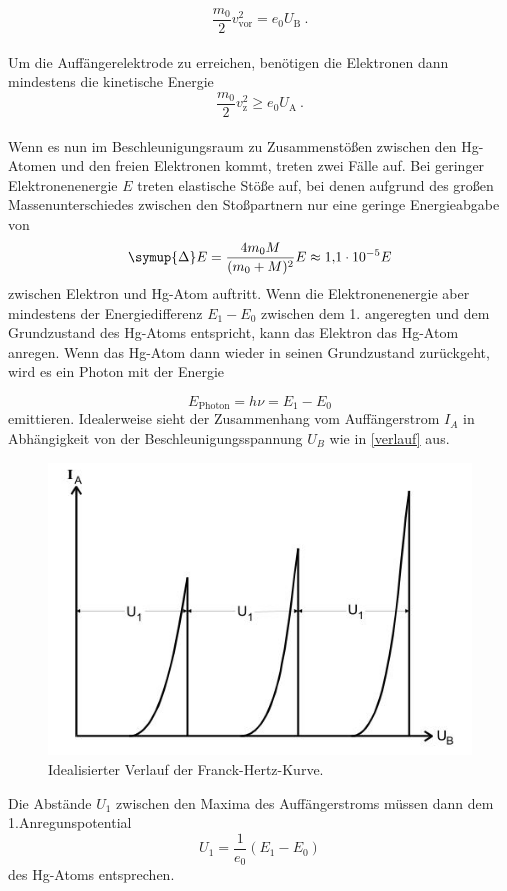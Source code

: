 \begin{equation*}
    \frac{m_0}{2}v^2_\text{vor} = e_0 U_\text{B} \ .
\end{equation*}
\\
Um die Auffängerelektrode zu erreichen, benötigen die Elektronen dann mindestens die kinetische Energie
\begin{equation}
    \frac{m_0}{2}v^2_\text{z} \geq e_0 U_\text{A} \ .
    \label{eqn:energie}
\end{equation}
\\
Wenn es nun im Beschleunigungsraum zu Zusammenstößen zwischen den Hg-Atomen und den freien Elektronen kommt, treten zwei Fälle auf. Bei geringer Elektronenenergie $E$ treten elastische Stöße auf, bei denen aufgrund des großen Massenunterschiedes zwischen den Stoßpartnern nur eine geringe Energieabgabe von 
\begin{equation*}
    \symup{\Delta}E = \frac{4 m_0 M}{(m_0 + M)^2} E \approx \num{1.1e-5} E
\end{equation*}
zwischen Elektron und Hg-Atom auftritt. Wenn die Elektronenenergie aber mindestens der Energiedifferenz $E_1 - E_0$ zwischen dem 1. angeregten und
dem Grundzustand des Hg-Atoms entspricht, kann das Elektron das Hg-Atom anregen. Wenn das Hg-Atom dann wieder in seinen Grundzustand zurückgeht, wird es ein
Photon mit der Energie

\begin{equation*}
    E_\text{Photon} = h \nu = E_1 - E_0
\end{equation*}
emittieren. Idealerweise sieht der Zusammenhang vom Auffängerstrom $I_A$ in Abhängigkeit von der Beschleunigungsspannung $U_B$ wie in \autoref{verlauf} aus.
\begin{figure}[H]
    \centering
    \includegraphics[width=\textwidth]{images/verlauf.JPG}
    \caption{Idealisierter Verlauf der Franck-Hertz-Kurve. \cite{V601}}
    \label{fig:verlauf}
  \end{figure}
\noindent
Die Abstände $U_1$ zwischen den Maxima des Auffängerstroms müssen dann dem 1.Anregunspotential
\begin{equation*}
      U_1 = \frac{1}{e_0} (E_1 - E_0)
  \end{equation*}
des Hg-Atoms entsprechen.

